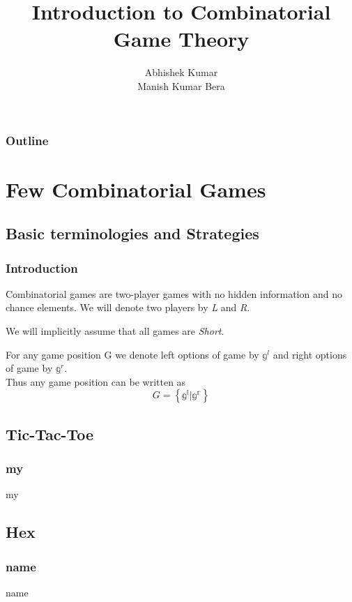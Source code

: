 \documentclass[12pt]{beamer}
\title{Introduction to Combinatorial Game Theory}
\author{Abhishek Kumar\\ Manish Kumar Bera}
\institute{IITK}
\begin{document}
\begin{frame}
\titlepage
\end{frame}

\begin{frame}
\frametitle{Outline}
\tableofcontents
\end{frame}

\section{Few Combinatorial Games}

\subsection{Basic terminologies and Strategies}

\begin{frame}

\frametitle{Introduction}

\begin{definition}
Combinatorial games are two-player games with no hidden information and no chance elements. We will denote two players by \textit{L} and \textit{R}.
\end{definition}

\pause

We will implicitly assume that all games are \textit{Short}.
\pause

\begin{definition}
For any game position G we denote left options of game by $ \mathbb{g^\textit{l}}$ and right options of game by $ \mathbb{g^\textit{r}}$.\\
Thus any game position can be written as
$$G = \left\{\mathbb{g^l} | \mathbb{g^r} \right\}$$
\end{definition}

\begin{example}

\end{example}
\end{frame}
\subsection{Tic-Tac-Toe}
\begin{frame}
\frametitle{my}
my
\end{frame}
\subsection{Hex}
\frametitle{name}
\begin{frame}
name
\end{frame}
\end{document}
